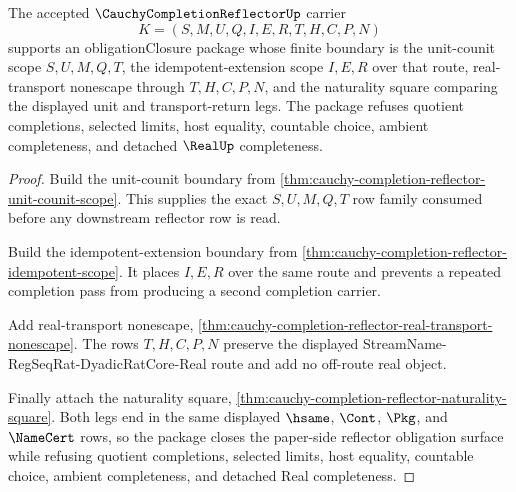 \begin{theorem}
\label{thm:cauchy-completion-reflector-obligation-closure-package}
The accepted $\CauchyCompletionReflectorUp$ carrier
$$
K=(S,M,U,Q,I,E,R,T,H,C,P,N)
$$
supports an obligationClosure package whose finite boundary is the unit-counit scope $S,U,M,Q,T$, the idempotent-extension scope $I,E,R$ over that route, real-transport nonescape through $T,H,C,P,N$, and the naturality square comparing the displayed unit and transport-return legs. The package refuses quotient completions, selected limits, host equality, countable choice, ambient completeness, and detached $\RealUp$ completeness.
\end{theorem}
\begin{proof}
Build the unit-counit boundary from \autoref{thm:cauchy-completion-reflector-unit-counit-scope}. This supplies the exact $S,U,M,Q,T$ row family consumed before any downstream reflector row is read.

Build the idempotent-extension boundary from \autoref{thm:cauchy-completion-reflector-idempotent-scope}. It places $I,E,R$ over the same route and prevents a repeated completion pass from producing a second completion carrier.

Add real-transport nonescape, \autoref{thm:cauchy-completion-reflector-real-transport-nonescape}. The rows $T,H,C,P,N$ preserve the displayed StreamName-RegSeqRat-DyadicRatCore-Real route and add no off-route real object.

Finally attach the naturality square, \autoref{thm:cauchy-completion-reflector-naturality-square}. Both legs end in the same displayed $\hsame$, $\Cont$, $\Pkg$, and $\NameCert$ rows, so the package closes the paper-side reflector obligation surface while refusing quotient completions, selected limits, host equality, countable choice, ambient completeness, and detached Real completeness.
\end{proof}

